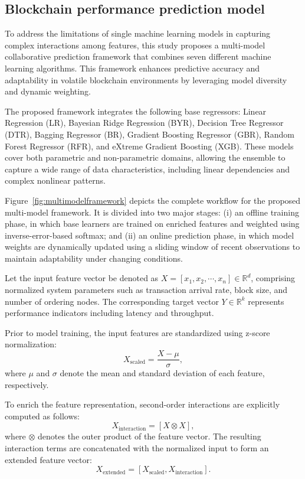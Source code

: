 \documentclass[a4paper,fleqn]{cas-dc}
\begin{document}
\subsection{Blockchain performance prediction model}
\vspace{6pt}

To address the limitations of single machine learning models in capturing complex interactions among features, this study proposes a multi-model collaborative prediction framework that combines seven different machine learning algorithms. This framework enhances predictive accuracy and adaptability in volatile blockchain environments by leveraging model diversity and dynamic weighting.

The proposed framework integrates the following base regressors: Linear Regression (LR), Bayesian Ridge Regression (BYR), Decision Tree Regressor (DTR), Bagging Regressor (BR), Gradient Boosting Regressor (GBR), Random Forest Regressor (RFR), and eXtreme Gradient Boosting (XGB). These models cover both parametric and non-parametric domains, allowing the ensemble to capture a wide range of data characteristics, including linear dependencies and complex nonlinear patterns.

Figure~\ref{fig:multimodelframework} depicts the complete workflow for the proposed multi-model framework. It is divided into two major stages: (i) an offline training phase, in which base learners are trained on enriched features and weighted using inverse-error-based softmax; and (ii) an online prediction phase, in which model weights are dynamically updated using a sliding window of recent observations to maintain adaptability under changing conditions.


Let the input feature vector be denoted as \(X = [x_1, x_2, \cdots, x_n] \in \mathbb{R}^d\), comprising normalized system parameters such as transaction arrival rate, block size, and number of ordering nodes. The corresponding target vector \(Y \in \mathbb{R}^k\) represents performance indicators including latency and throughput.

Prior to model training, the input features are standardized using z-score normalization:
\begin{equation}
	X_{\text{scaled}} = \frac{X - \mu}{\sigma},
\end{equation}
where \(\mu\) and \(\sigma\) denote the mean and standard deviation of each feature, respectively.

To enrich the feature representation, second-order interactions are explicitly computed as follows:
\begin{equation}
	X_{\text{interaction}} = [X \otimes X],
\end{equation}
where \(\otimes\) denotes the outer product of the feature vector. The resulting interaction terms are concatenated with the normalized input to form an extended feature vector:
\begin{equation}
	X_{\text{extended}} = [X_{\text{scaled}}, X_{\text{interaction}}].
\end{equation}
\end{document}
